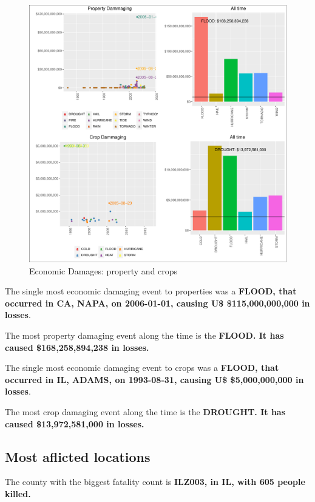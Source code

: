 \documentclass[]{article}
\begin{document}
\begin{figure}[htbp]
\centering
\includegraphics{readme_files/figure-latex/economic-plot-1.pdf}
\caption{Economic Damages: property and crops}
\end{figure}

The single most economic damaging event to properties was a
\textbf{FLOOD, that occurred in CA, NAPA, on 2006-01-01, causing U\$
\$115,000,000,000 in losses}.

The most property damaging event along the time is the \textbf{FLOOD. It
has caused \$168,258,894,238 in losses.}

The single most economic damaging event to crops was a \textbf{FLOOD,
that occurred in IL, ADAMS, on 1993-08-31, causing U\$ \$5,000,000,000
in losses}.

The most crop damaging event along the time is the \textbf{DROUGHT. It
has caused \$13,972,581,000 in losses.}

\subsection{Most aflicted locations}\label{most-aflicted-locations-1}

The county with the biggest fatality count is \textbf{ILZ003, in IL,
with 605 people killed.}
\end{document}
